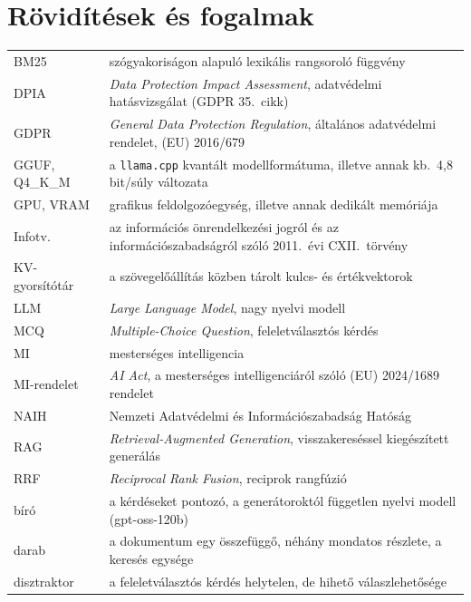 \chapter*{Rövidítések és fogalmak}
\thispagestyle{plain}

\begin{singlespace}
\small
\begin{longtable}{@{}p{3.2cm}p{11.6cm}@{}}
BM25 & szógyakoriságon alapuló lexikális rangsoroló függvény\\
DPIA & \emph{Data Protection Impact Assessment}, adatvédelmi hatásvizsgálat (GDPR 35.~cikk)\\
GDPR & \emph{General Data Protection Regulation}, általános adatvédelmi rendelet, (EU) 2016/679\\
GGUF, Q4\_K\_M & a \texttt{llama.cpp} kvantált modellformátuma, illetve annak kb.\ 4,8 bit/súly változata\\
GPU, VRAM & grafikus feldolgozóegység, illetve annak dedikált memóriája\\
Infotv. & az információs önrendelkezési jogról és az információszabadságról szóló 2011.~évi CXII.\ törvény\\
KV-gyorsítótár & a szövegelőállítás közben tárolt kulcs- és értékvektorok\\
LLM & \emph{Large Language Model}, nagy nyelvi modell\\
MCQ & \emph{Multiple-Choice Question}, feleletválasztós kérdés\\
MI & mesterséges intelligencia\\
MI-rendelet & \emph{AI Act}, a mesterséges intelligenciáról szóló (EU) 2024/1689 rendelet\\
NAIH & Nemzeti Adatvédelmi és Információszabadság Hatóság\\
RAG & \emph{Retrieval-Augmented Generation}, visszakereséssel kiegészített generálás\\
RRF & \emph{Reciprocal Rank Fusion}, reciprok rangfúzió\\[3pt]
bíró & a kérdéseket pontozó, a generátoroktól független nyelvi modell (gpt-oss-120b)\\
darab & a dokumentum egy összefüggő, néhány mondatos részlete, a keresés egysége\\
disztraktor & a feleletválasztós kérdés helytelen, de hihető válaszlehetősége\\

\end{longtable}
\end{singlespace}
